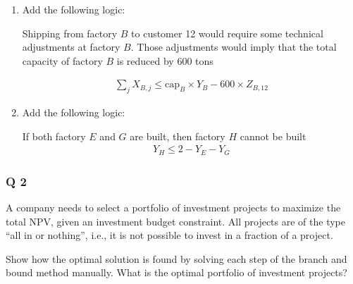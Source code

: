 \documentclass[10pt]{article}
\begin{document}
\begin{enumerate}
    Iff. products are shipped from a given factory (factory $D $) to a given customer ($7 $), then the quantity shipped from $D $ to 7 must be above 3,000 tons. 

    \begin{gather*}
        X_{D, 7} \ge 3000 \times Z_{D, 7} 
    \end{gather*}
    \item Add the following logic: 

    Shipping from factory $B $ to customer 12 would require some technical adjustments at factory $B $. Those adjustments would imply that the total capacity of factory $B $ is reduced by 600 tons 

    \begin{gather*}
        \sum_j X_{B, j}\le \text{cap}_B\times Y_B - 600\times Z_{B, 12}
    \end{gather*}
    \item Add the following logic: 

    If both factory $E $ and $G $ are built, then factory $H $ cannot be built
    \begin{gather*}
        Y_H \le 2 - Y_E - Y_G
    \end{gather*}
\end{enumerate}
\newpage 
\subsubsection{Q 2}
A company needs to select a portfolio of investment projects to maximize the total NPV, given an investment budget constraint. All projects are of the type ``all in or nothing'', i.e., it is not possible to invest in a fraction of a project. 

Show how the optimal solution is found by solving each step of the branch and bound method manually. What is the optimal portfolio of investment projects?
\end{document}
